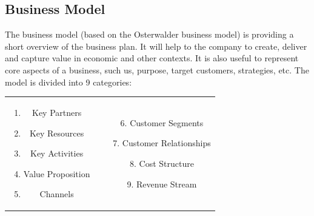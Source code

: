 \subsection{Business Model}
The business model (based on the Osterwalder business model) is providing a short overview of the business plan. It will help to the company to create, deliver and capture value in economic and other contexts. It is also useful to represent core aspects of a business, such us, purpose, target customers, strategies, etc.  The model is divided into 9 categories: 
\begin{table}[h!]
\begin{tabular}{c c}
\begin{minipage}{8cm}
\begin{enumerate}
\item Key Partners
\item Key Resources
\item Key Activities
\item Value Proposition
\item Channels
\end{enumerate}
\end{minipage}
&
\begin{minipage}{8cm}
\begin{enumerate}[]
\item [6.] Customer Segments
\item [7.] Customer Relationships
\item [8.] Cost Structure
\item [9.] Revenue Stream
\end{enumerate}
\end{minipage}
\\
\end{tabular}
\end{table}

